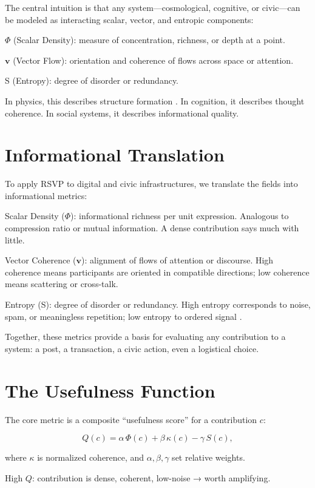 \documentclass{book}
\begin{document}
The central intuition is that any system—cosmological, cognitive, or civic—can be modeled as interacting scalar, vector, and entropic components:

\(\Phi\) (Scalar Density): measure of concentration, richness, or depth at a point.

\(\mathbf{v}\) (Vector Flow): orientation and coherence of flows across space or attention.

S (Entropy): degree of disorder or redundancy.

In physics, this describes structure formation \cite{prigogine1984}. In cognition, it describes thought coherence. In social systems, it describes informational quality.

\section{Informational Translation}

To apply RSVP to digital and civic infrastructures, we translate the fields into informational metrics:

Scalar Density (\(\Phi\)): informational richness per unit expression. Analogous to compression ratio or mutual information. A dense contribution says much with little.

Vector Coherence (\(\mathbf{v}\)): alignment of flows of attention or discourse. High coherence means participants are oriented in compatible directions; low coherence means scattering or cross-talk.

Entropy (S): degree of disorder or redundancy. High entropy corresponds to noise, spam, or meaningless repetition; low entropy to ordered signal \cite{shannon1948}.

Together, these metrics provide a basis for evaluating any contribution to a system: a post, a transaction, a civic action, even a logistical choice.

\section{The Usefulness Function}

The core metric is a composite “usefulness score” for a contribution \( c \):

\[ Q(c) = \alpha \, \Phi(c) + \beta \, \kappa(c) - \gamma \, S(c), \]

where \(\kappa\) is normalized coherence, and \(\alpha, \beta, \gamma\) set relative weights.

High \( Q \): contribution is dense, coherent, low-noise → worth amplifying.
\end{document}
